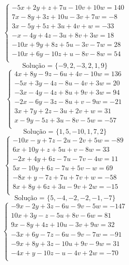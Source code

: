 \documentclass[12pt,oneside,a4paper]{article}
\begin{document}
\vspace{\baselineskip}
\begin{equation*}
\begin{cases}
-5x+2y+z+7u-10v+10w=140 \\
7x-8y+3z+10u-3v+7w=-8 \\
3x-5y+5z+3u+4v+w=-33 \\
-x-4y+4z-3u+8v+3w=18 \\
-10x+9y+8z+5u-3v-7w=28 \\
-10x+6y-10z+u-8v-8w=54 \\
\end{cases}
\end{equation*}
\begin{equation*}
\text{Solução = }\{-9,2,-3,2,1,9\}
\end{equation*}
\vspace{\baselineskip}
\begin{equation*}
\begin{cases}
4x+8y-9z-6u+4v-10w=136 \\
-5x+3y-4z-8u-4v+3w=20 \\
-3x-4y-4z+8u+9v+3w=94 \\
-2x-6y-3z-8u+v-9w=-21 \\
3x+7y+2z-3u+2v+w=31 \\
x-9y-5z+3u-8v-5w=-57 \\
\end{cases}
\end{equation*}
\begin{equation*}
\text{Solução = }\{1,5,-10,1,7,2\}
\end{equation*}
\vspace{\baselineskip}
\begin{equation*}
\begin{cases}
-10x-y+7z-2u-2v+5w=-89 \\
6x+10y+z+5u+v-8w=33 \\
-2x+4y+6z-7u-7v-4w=11 \\
5x-10y+6z-7u+5v-w=69 \\
-8x+y-7z+7u+7v+w=-58 \\
8x+8y+6z+3u-9v+2w=-15 \\
\end{cases}
\end{equation*}
\begin{equation*}
\text{Solução = }\{5,-4,-2,-2,-1,-7\}
\end{equation*}
\vspace{\baselineskip}
\begin{equation*}
\begin{cases}
-9x-2y+3z-6u-9v-5w=-147 \\
10x+3y-z-5u+8v-6w=81 \\
9x-8y+4z+10u-3v+9w=32 \\
-3x+6y-7z-6u-9v-7w=-91 \\
-9x+8y+3z-10u+9v-9w=31 \\
-4x+y-10z-u-4v+2w=-70 \\
\end{cases}
\end{equation*}
\end{document}
